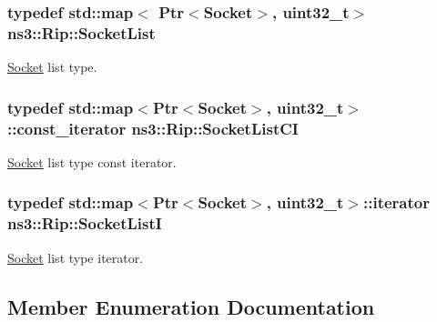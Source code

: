 \subsubsection[{\texorpdfstring{Socket\+List}{SocketList}}]{\setlength{\rightskip}{0pt plus 5cm}typedef std\+::map$<$ {\bf Ptr}$<${\bf Socket}$>$, uint32\+\_\+t$>$ {\bf ns3\+::\+Rip\+::\+Socket\+List}\hspace{0.3cm}{\ttfamily [private]}}\hypertarget{classns3_1_1Rip_afc81050735dfff6d48facd8284f0954f}{}\label{classns3_1_1Rip_afc81050735dfff6d48facd8284f0954f}


\hyperlink{classns3_1_1Socket}{Socket} list type. 

\subsubsection[{\texorpdfstring{Socket\+List\+CI}{SocketListCI}}]{\setlength{\rightskip}{0pt plus 5cm}typedef std\+::map$<${\bf Ptr}$<${\bf Socket}$>$, uint32\+\_\+t$>$\+::const\+\_\+iterator {\bf ns3\+::\+Rip\+::\+Socket\+List\+CI}\hspace{0.3cm}{\ttfamily [private]}}\hypertarget{classns3_1_1Rip_a685ab5baf3f942d84aba0c3d4784035f}{}\label{classns3_1_1Rip_a685ab5baf3f942d84aba0c3d4784035f}


\hyperlink{classns3_1_1Socket}{Socket} list type const iterator. 

\subsubsection[{\texorpdfstring{Socket\+ListI}{SocketListI}}]{\setlength{\rightskip}{0pt plus 5cm}typedef std\+::map$<${\bf Ptr}$<${\bf Socket}$>$, uint32\+\_\+t$>$\+::iterator {\bf ns3\+::\+Rip\+::\+Socket\+ListI}\hspace{0.3cm}{\ttfamily [private]}}\hypertarget{classns3_1_1Rip_a0395b3977eeeb90190ccfa5758a3957f}{}\label{classns3_1_1Rip_a0395b3977eeeb90190ccfa5758a3957f}


\hyperlink{classns3_1_1Socket}{Socket} list type iterator. 



\subsection{Member Enumeration Documentation}
